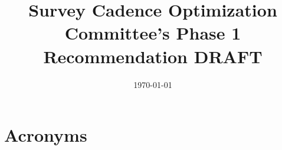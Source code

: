 \documentclass[modern]{aastex62}
\begin{document}

\date{\today}
\title{Survey Cadence Optimization Committee's Phase 1 Recommendation DRAFT}





%
%
%

\section{Acronyms} \label{sec:acronyms}

\end{document}
